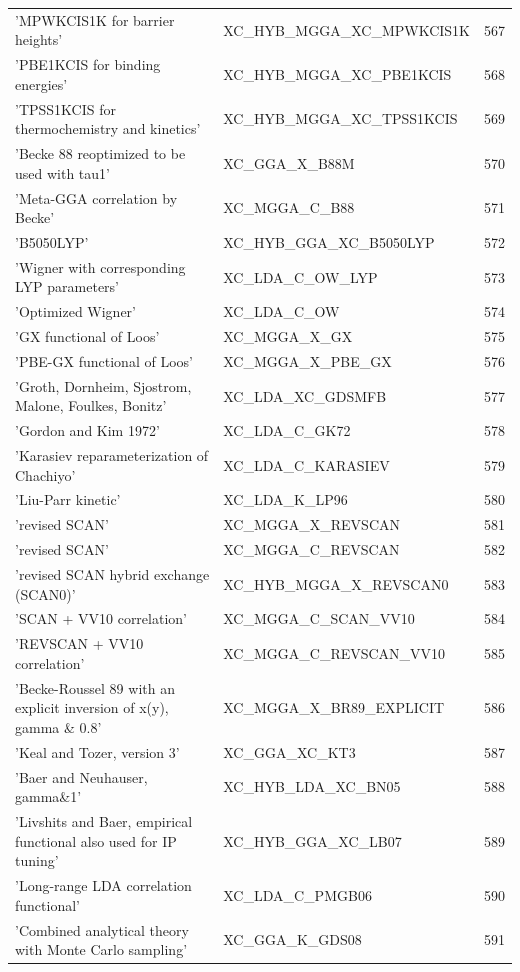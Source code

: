 \documentclass[final,12pt,makeidx,DIV=calc]{article}
\begin{document}
{{{{{{\begin{table}[!h]
\begin{center}
\begin{tabular}{llr}
  'MPWKCIS1K for barrier heights' & XC\_HYB\_MGGA\_XC\_MPWKCIS1K  &567\\
  'PBE1KCIS for binding energies' & XC\_HYB\_MGGA\_XC\_PBE1KCIS  &568\\
  'TPSS1KCIS for thermochemistry and kinetics' & XC\_HYB\_MGGA\_XC\_TPSS1KCIS  &569\\
  'Becke 88 reoptimized to be used with tau1' & XC\_GGA\_X\_B88M  &570\\
  'Meta-GGA correlation by Becke' & XC\_MGGA\_C\_B88  &571\\
  'B5050LYP' & XC\_HYB\_GGA\_XC\_B5050LYP  &572\\
  'Wigner with corresponding LYP parameters' & XC\_LDA\_C\_OW\_LYP  &573\\
  'Optimized Wigner' & XC\_LDA\_C\_OW  &574\\
  'GX functional of Loos' & XC\_MGGA\_X\_GX  &575\\
  'PBE-GX functional of Loos' & XC\_MGGA\_X\_PBE\_GX  &576\\
  'Groth, Dornheim, Sjostrom, Malone, Foulkes, Bonitz' & XC\_LDA\_XC\_GDSMFB  &577\\
  'Gordon and Kim 1972' & XC\_LDA\_C\_GK72  &578\\
  'Karasiev reparameterization of Chachiyo' & XC\_LDA\_C\_KARASIEV  &579\\
  'Liu-Parr kinetic' & XC\_LDA\_K\_LP96  &580\\
  'revised SCAN' & XC\_MGGA\_X\_REVSCAN  &581\\
  'revised SCAN' & XC\_MGGA\_C\_REVSCAN  &582\\
  'revised SCAN hybrid exchange (SCAN0)' & XC\_HYB\_MGGA\_X\_REVSCAN0  &583\\
  'SCAN + VV10 correlation' & XC\_MGGA\_C\_SCAN\_VV10  &584\\
  'REVSCAN + VV10 correlation' & XC\_MGGA\_C\_REVSCAN\_VV10  &585\\
  'Becke-Roussel 89 with an explicit inversion of x(y), gamma \& 0.8' & XC\_MGGA\_X\_BR89\_EXPLICIT  &586\\
  'Keal and Tozer, version 3' & XC\_GGA\_XC\_KT3  &587\\
  'Baer and Neuhauser, gamma\&1' & XC\_HYB\_LDA\_XC\_BN05  &588\\
  'Livshits and Baer, empirical functional also used for IP tuning' & XC\_HYB\_GGA\_XC\_LB07  &589\\
  'Long-range LDA correlation functional' & XC\_LDA\_C\_PMGB06  &590\\
  'Combined analytical theory with Monte Carlo sampling' & XC\_GGA\_K\_GDS08  &591\\

\end{tabular}
\end{center}
\end{table}}}}}}}
\end{document}
